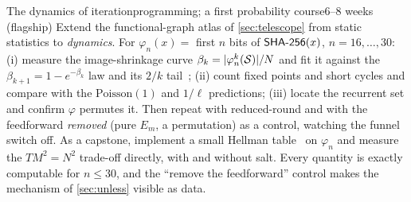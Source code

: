 \begin{project}{The dynamics of iteration}{programming; a first
  probability course}{6--8 weeks (flagship)}
  Extend the functional-graph atlas of \cref{sec:telescope} from static
  statistics to \emph{dynamics}. For $\varphi_{n}(x) = $ first $n$ bits
  of $\textsf{SHA-256}(x)$, $n = 16, \dots, 30$: (i) measure the image-shrinkage
  curve $\beta_{k}=|\varphi_{n}^{k}(\mathcal{S})|/N$ and fit it against the
  $\beta_{k+1}=1-e^{-\beta_{k}}$ law and its $2/k$
  tail~\citep{FlajoletOdlyzko1990}; (ii) count fixed points and short
  cycles and compare with the $\mathrm{Poisson}(1)$ and $1/\ell$
  predictions; (iii) locate the recurrent set and confirm $\varphi$
  permutes it. Then repeat with reduced-round \SHA{} and with the
  feedforward \emph{removed} (pure $E_{m}$, a permutation) as a control,
  watching the funnel switch off. As a capstone, implement a small
  Hellman table~\citep{Hellman1980} on $\varphi_{n}$ and measure the
  $TM^{2}=N^{2}$ trade-off directly, with and without salt. Every
  quantity is exactly computable for $n \le 30$, and the ``remove the
  feedforward'' control makes the mechanism of \cref{sec:unless} visible
  as data.
\end{project}
